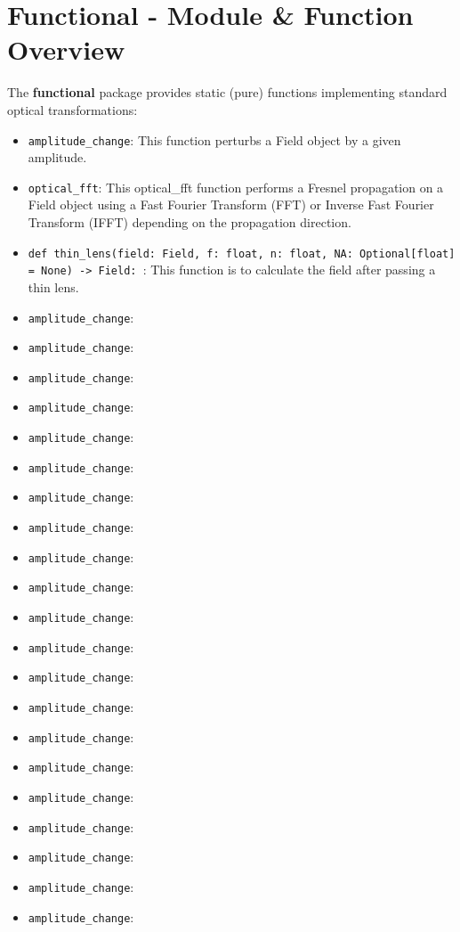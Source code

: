 \documentclass[a4paper,12pt]{report}
\begin{document}
\section{Functional - Module \& Function Overview}
The \textbf{functional} package provides static (pure) functions implementing standard optical transformations:
\begin{itemize}
    \item \texttt{amplitude_change}: This function perturbs a Field object by a given amplitude.
    \item \texttt{optical_fft}: This optical_fft function performs a Fresnel propagation on a Field object using a Fast Fourier Transform (FFT) or Inverse Fast Fourier Transform (IFFT) depending on the propagation direction.
    \item \texttt{def thin_lens(field: Field, f: float, n: float, NA: Optional[float] = None) -> Field:
}: This function is to calculate the field after passing a thin lens.
    \item \texttt{amplitude_change}:
    \item \texttt{amplitude_change}:
    \item \texttt{amplitude_change}:
    \item \texttt{amplitude_change}:
    \item \texttt{amplitude_change}:
    \item \texttt{amplitude_change}:
    \item \texttt{amplitude_change}:
    \item \texttt{amplitude_change}:
    \item \texttt{amplitude_change}:
    \item \texttt{amplitude_change}:
    \item \texttt{amplitude_change}:
    \item \texttt{amplitude_change}:
    \item \texttt{amplitude_change}:
    \item \texttt{amplitude_change}:
    \item \texttt{amplitude_change}:
    \item \texttt{amplitude_change}:
    \item \texttt{amplitude_change}:
    \item \texttt{amplitude_change}:
    \item \texttt{amplitude_change}:
    \item \texttt{amplitude_change}:
    \item \texttt{amplitude_change}:

\end{itemize}
\end{document}
